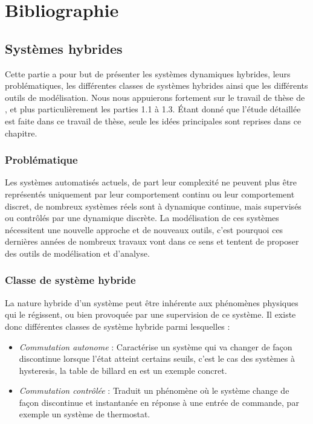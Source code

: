 \chapter{Bibliographie}
\section{Systèmes hybrides}

Cette partie a pour but de présenter les systèmes dynamiques hybrides, leurs problématiques, les différentes classes de systèmes hybrides ainsi que les différents outils de modélisation.
Nous nous appuierons fortement sur le travail de thèse de \cite{Kur02}, et plus particulièrement les parties 1.1 à 1.3. Étant donné que l'étude détaillée est faite dans ce travail de thèse, seule les idées principales sont reprises dans ce chapitre.

\subsection{Problématique}
Les systèmes automatisés actuels, de part leur complexité ne peuvent plus être représentés uniquement par leur comportement continu ou leur comportement discret, de nombreux systèmes réels sont à dynamique continue, mais supervisés ou contrôlés par une dynamique discrète. La modélisation de ces systèmes nécessitent une nouvelle approche et de nouveaux outils, c'est pourquoi ces dernières années de nombreux travaux vont dans ce sens et tentent de proposer des outils de modélisation et d'analyse.

\subsection{Classe de système hybride}
La nature hybride d'un système peut être inhérente aux phénomènes physiques qui le régissent, ou bien provoquée par une supervision de ce système. Il existe donc différentes classes de système hybride parmi lesquelles : 
\begin{itemize}
	\item \emph{Commutation autonome} : Caractérise un système qui va changer de façon discontinue lorsque l'état atteint certains seuils, c'est le cas des systèmes à hysteresis, la table de billard en est un exemple concret.
	\item \emph{Commutation contrôlée} : Traduit un phénomène où le système change de façon discontinue et instantanée en réponse à une entrée de commande, par exemple un système de thermostat. 
\end{itemize}

